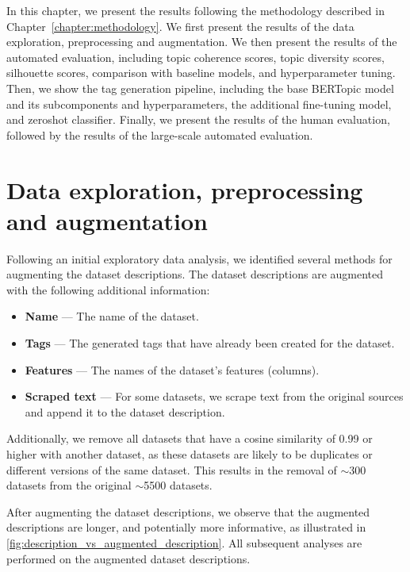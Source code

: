 In this chapter, we present the results following the methodology described in Chapter~\ref{chapter:methodology}. We first present the results of the data exploration, preprocessing and augmentation. We then present the results of the automated evaluation, including topic coherence scores, topic diversity scores, silhouette scores, comparison with baseline models, and hyperparameter tuning. Then, we show the tag generation pipeline, including the base BERTopic model and its subcomponents and hyperparameters, the additional fine-tuning model, and zeroshot classifier. Finally, we present the results of the human evaluation, followed by the results of the large-scale automated evaluation.

\section{Data exploration, preprocessing and augmentation}
\label{sec:data_exploration}
Following an initial exploratory data analysis, we identified several methods for augmenting the dataset descriptions. The dataset descriptions are augmented with the following additional information:

\begin{itemize}
    \item \textbf{Name} — The name of the dataset.
    \item \textbf{Tags} — The generated tags that have already been created for the dataset.
    \item \textbf{Features} — The names of the dataset's features (columns).
    \item \textbf{Scraped text} — For some datasets, we scrape text from the original sources and append it to the dataset description.
\end{itemize}

Additionally, we remove all datasets that have a cosine similarity of 0.99 or higher with another dataset, as these datasets are likely to be duplicates or different versions of the same dataset. This results in the removal of $\sim$300 datasets from the original $\sim$5500 datasets.

After augmenting the dataset descriptions, we observe that the augmented descriptions are longer, and potentially more informative, as illustrated in \cref{fig:description_vs_augmented_description}. All subsequent analyses are performed on the augmented dataset descriptions.

